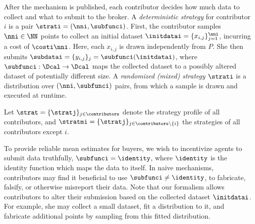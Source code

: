 

After the mechanism is published, each contributor decides how much data to collect and what to submit to the broker. A \emph{deterministic strategy} for contributor $i$ is a pair $\strati = (\nni, \subfunci)$. First, the contributor samples $\nni \in \NN$ points to collect an initial dataset $\initdatai = \{x_{i,j}\}_{j=1}^{\nni}$, incurring a cost of $\costi \nni$. Here, each $x_{i,j}$ is drawn independently from $P$. She then submits $\subdatai = \{y_{i,j}\}_j = \subfunci(\initdatai)$, where $\subfunci : \Dcal \to \Dcal$ maps the collected dataset to a possibly altered dataset of potentially different size.  
A \emph{randomized (mixed) strategy} $\strati$ is a distribution over $(\nni, \subfunci)$ pairs, from which a sample is drawn and executed at runtime.


Let $\strat = \{\stratj\}_{j \in \contributors}$ denote the strategy profile of all contributors, and $\stratmi = \{\stratj\}_{j \in \contributors \setminus \{i\}}$ the strategies of all contributors except $i$.

To provide reliable mean estimates for buyers, 
we wish to incentivize agents to submit data truthfully, \ie 
$\subfunci=\identity$, where $\identity$ is the identity function which maps the data to itself.
In naive mechanisms, contributors may find it beneficial to use $\subfunci\neq\identity$, to fabricate, falsify, or otherwise misreport their data.
Note that our formalism allows contributors to alter their submission based on the collected dataset $\initdatai$. For example, she may collect a small dataset, fit a distribution to it, and fabricate additional points by sampling from this fitted distribution.





